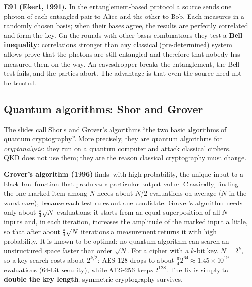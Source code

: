 \textbf{E91 (Ekert, 1991).} In the entanglement-based protocol a source sends one photon of each entangled pair to Alice and the other to Bob. Each measures in a randomly chosen basis; when their bases agree, the results are perfectly correlated and form the key. On the rounds with other basis combinations they test a \textbf{Bell inequality}: correlations stronger than any classical (pre-determined) system allows prove that the photons are still entangled and therefore that nobody has measured them on the way. An eavesdropper breaks the entanglement, the Bell test fails, and the parties abort. The advantage is that even the source need not be trusted.

\subsection{Quantum algorithms: Shor and Grover \hot\new}

The slides call Shor's and Grover's algorithms ``the two basic algorithms of quantum cryptography''. More precisely, they are quantum algorithms for \emph{cryptanalysis}: they run on a quantum computer and attack classical ciphers. QKD does not use them; they are the reason classical cryptography must change.

\textbf{Grover's algorithm (1996)} finds, with high probability, the unique input to a black-box function that produces a particular output value. Classically, finding the one marked item among $N$ needs about $N/2$ evaluations on average ($N$ in the worst case), because each test rules out one candidate. Grover's algorithm needs only about $\frac{\pi}{4}\sqrt N$ evaluations: it starts from an equal superposition of all $N$ inputs and, in each iteration, increases the amplitude of the marked input a little, so that after about $\frac{\pi}{4}\sqrt N$ iterations a measurement returns it with high probability. It is known to be optimal: no quantum algorithm can search an unstructured space faster than order $\sqrt N$. For a cipher with a $k$-bit key, $N = 2^k$, so a key search costs about $2^{k/2}$:  AES-128 drops to about $\frac{\pi}{4} 2^{64} \approx 1.45 \times 10^{19}$ evaluations (64-bit security), while AES-256 keeps $2^{128}$. The fix is simply to \textbf{double the key length}; symmetric cryptography survives.

